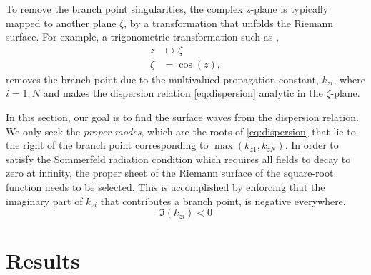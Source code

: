To remove the branch point singularities, the complex z-plane is typically mapped to another plane $\zeta$, by a transformation that unfolds the Riemann surface. For example, a trigonometric transformation such as \cite{Michalski2006,Polimeridis_2007},
%
\begin{equation}
  \begin{split}
    z &\mapsto \zeta \\
    \zeta &= \cos (z),
  \end{split}
  \label{eq:mapping}%
\end{equation}
%
removes the branch point due to the multivalued propagation constant, $k_{zi}$, where $i = 1,N$ and makes the dispersion relation \eqref{eq:dispersion} analytic in the $\zeta$-plane.
%
%

In this section, our goal is to find the surface waves from the dispersion relation. We only seek the \emph{proper modes}, which are the roots of \eqref{eq:dispersion} that lie to the right of the branch point corresponding to $\max(k_{z1},k_{zN})$. In order to satisfy the Sommerfeld radiation condition which requires all fields to decay to zero at infinity, the proper sheet of the Riemann surface of the square-root function needs to be selected. This is accomplished by enforcing that the imaginary part of $k_{zi}$ that contributes a branch point, is negative everywhere.
%
\begin{equation}
  \Im (k_{zi}) < 0
  \label{eq:proper}
\end{equation}
%
\section{Results}
%
